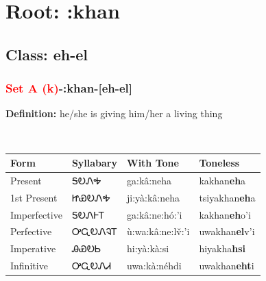 \needspace{4in}
\section*{Root: :khan}
\nopagebreak
{}
\needspace{3in}
\subsection*{Class: eh-el}
\nopagebreak
\needspace{2in}
\subsubsection*{\textcolor{Red}{Set A (k)}{-}\textbf{:khan}{-}[eh-el]}
\nopagebreak
\textbf{Definition: } he/she is giving him/her a living thing
\\[0.5em]
\begin{tabularx}{\textwidth}{l X X X}%
\toprule%
\textbf{Form}&\textbf{Syllabary}&\textbf{With Tone}&\textbf{Toneless}\\%
\midrule%
Present&ᎦᎧᏁᎭ&ga:kâ:neha&kakhan\textbf{eh}a\\%
1st Present&ᏥᏯᎧᏁᎭ&ji:yà:kâ:neha&tsiyakhan\textbf{eh}a\\%
Imperfective&ᎦᎧᏁᎰᎢ&ga:kâ:ne:hó:’i&kakhan\textbf{eh}o'i\\%
Perfective&ᎤᏩᎧᏁᎸᎢ&ù:wa:kâ:ne:lv̌:’i&uwakhan\textbf{el}v'i\\%
Imperative&ᎯᏯᎧᏏ&hi:yà:kà:si&hiyakha\textbf{hsi}\\%
Infinitive&ᎤᏩᎧᏁᏗ&uwa:kà:néhdi&uwakhan\textbf{eht}i\\%
\bottomrule%
\end{tabularx}
\\[1em]